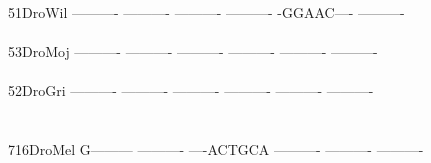 \documentclass[11pt,twoside,reqno,a4paper]{article}
\begin{document}
{51\hspace*{3\charwidth}DroWil	----------	----------	----------	----------	-GGAAC----	----------	\\
\hspace*{5\charwidth}\hspace*{7\charwidth}\hspace*{1\charwidth}\hspace*{1\charwidth}\hspace*{1\charwidth}\hspace*{1\charwidth}\hspace*{1\charwidth}\hspace*{1\charwidth}\\
53\hspace*{3\charwidth}DroMoj	----------	----------	----------	----------	----------	----------	\\
\hspace*{5\charwidth}\hspace*{7\charwidth}\hspace*{1\charwidth}\hspace*{1\charwidth}\hspace*{1\charwidth}\hspace*{1\charwidth}\hspace*{1\charwidth}\hspace*{1\charwidth}\\
52\hspace*{3\charwidth}DroGri	----------	----------	----------	----------	----------	----------	\\
\hspace*{5\charwidth}\hspace*{7\charwidth}\hspace*{1\charwidth}\hspace*{1\charwidth}\hspace*{1\charwidth}\hspace*{1\charwidth}\hspace*{1\charwidth}\hspace*{1\charwidth}\\
\\
716\hspace*{2\charwidth}DroMel	G---------	----------	----ACTGCA	----------	----------	----------	\\
\hspace*{5\charwidth}\hspace*{7\charwidth}\hspace*{1\charwidth}\hspace*{1\charwidth}\hspace*{1\charwidth}\hspace*{1\charwidth}\hspace*{1\charwidth}\hspace*{1\charwidth}\\
}
\end{document}
